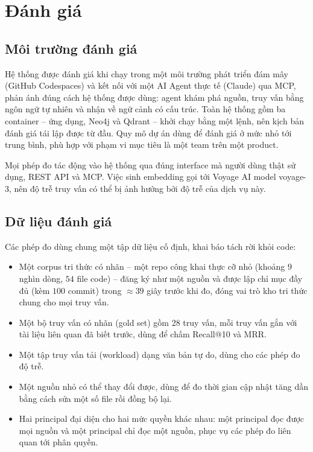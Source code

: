 \section{Đánh giá}

\subsection{Môi trường đánh giá}

Hệ thống được đánh giá khi chạy trong một môi trường phát triển đám mây (GitHub Codespaces) và kết nối với một AI Agent thực tế (Claude) qua MCP, phản ánh đúng cách hệ thống được dùng: agent khám phá nguồn, truy vấn bằng ngôn ngữ tự nhiên và nhận về ngữ cảnh có cấu trúc. Toàn hệ thống gồm ba container -- ứng dụng, Neo4j và Qdrant -- khởi chạy bằng một lệnh, nên kịch bản đánh giá tái lập được từ đầu. Quy mô dự án dùng để đánh giá ở mức nhỏ tới trung bình, phù hợp với phạm vi mục tiêu là một team trên một product.

Mọi phép đo tác động vào hệ thống qua đúng interface mà người dùng thật sử dụng, REST API và MCP. Việc sinh embedding gọi tới Voyage AI model voyage-3, nên độ trễ truy vấn có thể bị ảnh hưởng bởi độ trễ của dịch vụ này.

\subsection{Dữ liệu đánh giá}

Các phép đo dùng chung một tập dữ liệu cố định, khai báo tách rời khỏi code:

\begin{itemize}
  \item Một corpus tri thức có nhãn -- một repo công khai thực cỡ nhỏ (khoảng $9$ nghìn dòng, $54$ file code) -- đăng ký như một nguồn và được lập chỉ mục đầy đủ (kèm $100$ commit) trong $\approx 39$ giây trước khi đo, đóng vai trò kho tri thức chung cho mọi truy vấn.
  \item Một bộ truy vấn có nhãn (gold set) gồm 28 truy vấn, mỗi truy vấn gắn với tài liệu liên quan đã biết trước, dùng để chấm Recall@10 và MRR.
  \item Một tập truy vấn tải (workload) dạng văn bản tự do, dùng cho các phép đo độ trễ.
  \item Một nguồn nhỏ có thể thay đổi được, dùng để đo thời gian cập nhật tăng dần bằng cách sửa một số file rồi đồng bộ lại.
  \item Hai principal đại diện cho hai mức quyền khác nhau: một principal đọc được mọi nguồn và một principal chỉ đọc một nguồn, phục vụ các phép đo liên quan tới phân quyền.
\end{itemize}

